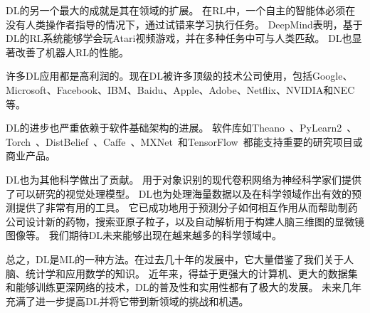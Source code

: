 \gls{DL}的另一个最大的成就是其在领域的扩展。
在\gls{RL}中，一个自主的智能体必须在没有人类操作者指导的情况下，通过试错来学习执行任务。
DeepMind表明，基于\gls{DL}的\gls{RL}系统能够学会玩Atari视频游戏，并在多种任务中可与人类匹敌\citep{mnih_human-level_2015}。
\gls{DL}也显著改善了机器人\gls{RL}的性能\citep{finn2015learning}。

许多\gls{DL}应用都是高利润的。现在\gls{DL}被许多顶级的技术公司使用，包括Google、Microsoft、Facebook、IBM、Baidu、Apple、Adobe、Netflix、NVIDIA和NEC等。

\gls{DL}的进步也严重依赖于软件基础架构的进展。
软件库如Theano~\citep{bergstra+al:2010-scipy,Bastien-2012}、PyLearn2~\citep{pylearn2_arxiv_2013}、Torch~\citep{Torch-2011}、DistBelief~\citep{Dean-et-al-NIPS2012}、Caffe~\citep{Jia13caffe}、MXNet~\citep{chen2015mxnet}和TensorFlow~\citep{tensorflow}都能支持重要的研究项目或商业产品。

\gls{DL}也为其他科学做出了贡献。
用于对象识别的现代卷积网络为神经科学家们提供了可以研究的视觉处理模型\citep{dicarlo-tutorial-2013}。
\gls{DL}也为处理海量数据以及在科学领域作出有效的预测提供了非常有用的工具。
它已成功地用于预测分子如何相互作用从而帮助制药公司设计新的药物\citep{Dahl-et-al-arxiv2014}，搜索亚原子粒子\citep{baldi2014searching}，以及自动解析用于构建人脑三维图的显微镜图像\citep{knowles-barley_deep_2014}等。
我们期待\gls{DL}未来能够出现在越来越多的科学领域中。


总之，\gls{DL}是\gls{ML}的一种方法。在过去几十年的发展中，它大量借鉴了我们关于人脑、统计学和应用数学的知识。
近年来，得益于更强大的计算机、更大的数据集和能够训练更深网络的技术，\gls{DL}的普及性和实用性都有了极大的发展。
未来几年充满了进一步提高\gls{DL}并将它带到新领域的挑战和机遇。

